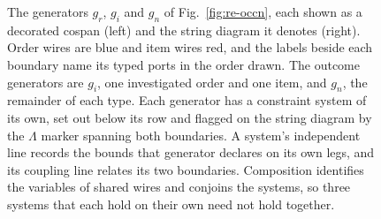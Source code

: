 \begin{figure}[tp]
  \centering
  \unskip
  \caption{The generators $g_r$, $g_i$ and $g_n$ of Fig.~\ref{fig:re-occn}, each shown as a decorated cospan (left)
    and the string diagram it denotes (right). Order wires are blue and item wires red, and the
    labels beside each boundary name its typed ports in the order drawn. The outcome
    generators are $g_i$, one investigated order and one item, and $g_n$, the remainder of
    each type. Each generator has a constraint system of its own, set out below its row and
    flagged on the string diagram by the $\Lambda$ marker spanning both boundaries. A
    system's independent line records the bounds that generator declares on its own legs,
    and its coupling line relates its two boundaries. Composition identifies the variables of
    shared wires and conjoins the systems, so three systems that each hold on their own need not
    hold together.}
  \label{fig:re-occn-cospans}
\end{figure}

